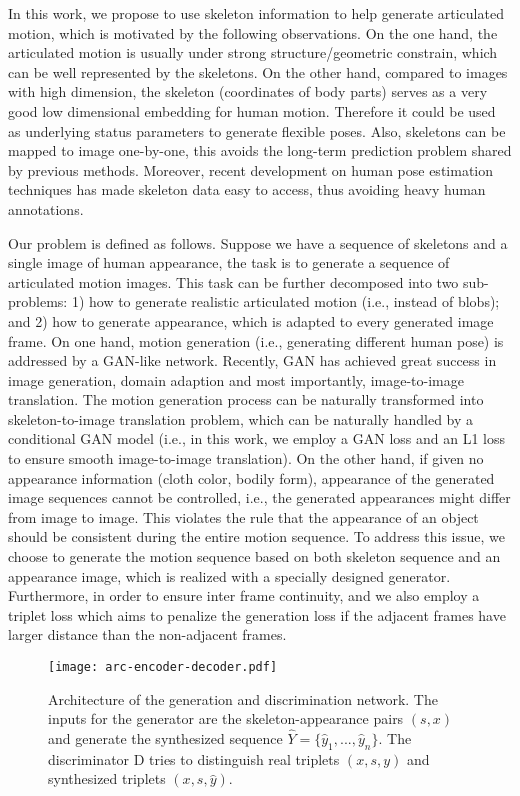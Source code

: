 \documentclass[journal]{IEEEtran}
\begin{document}
In this work, we propose to use skeleton information to help generate articulated motion, which is motivated by the following observations.
On the one hand, the articulated motion is usually under strong structure/geometric constrain, which can be well represented by the skeletons.
On the other hand, compared to images with high dimension, the skeleton (coordinates of body parts) serves as a very good low dimensional embedding for human motion. Therefore it could be used as underlying status parameters to generate flexible poses. Also, skeletons can be mapped to image one-by-one, this avoids the long-term prediction problem shared by previous methods.
Moreover, recent development on human pose estimation techniques has made skeleton data easy to access, thus avoiding heavy human annotations.

Our problem is defined as follows. Suppose we have a sequence of skeletons and a single image of human appearance, the task is to generate a sequence of articulated motion images. This task can be further decomposed into two sub-problems: 1) how to generate realistic articulated motion (i.e., instead of blobs); and 2) how to generate appearance, which is adapted to every generated image frame.
On one hand, motion generation (i.e., generating different human pose) is addressed by a GAN-like network. Recently, GAN has achieved great success in image generation, domain adaption and most importantly, image-to-image translation. The motion generation process can be naturally transformed into skeleton-to-image translation problem, which can be naturally handled by a conditional GAN model (i.e., in this work, we employ a GAN loss and an L1 loss to ensure smooth image-to-image translation). On the other hand, if given no appearance information (cloth color, bodily form), appearance of the generated image sequences cannot be controlled, i.e., the generated appearances might differ from image to image. This violates the rule that the appearance of an object should be consistent during the entire motion sequence. To address this issue, we choose to generate the motion sequence based on both skeleton sequence and an appearance image, which is realized with a specially designed generator. Furthermore, in order to ensure inter frame continuity, and we also employ a triplet loss which aims to penalize the generation loss if the adjacent frames have larger distance than the non-adjacent frames.
\begin{figure*}
\texttt{[image: arc-encoder-decoder.pdf]}
\caption{Architecture of the generation and discrimination network. The inputs for the generator are the skeleton-appearance pairs $(s,x)$ and generate the synthesized sequence $\hat{Y}=\{\hat{y}_1,...,\hat{y}_n\}$. The discriminator D tries to distinguish real triplets $(x,s,y)$ and synthesized triplets $(x,s,\hat{y})$.}
\label{fig:arc}
\end{figure*}
\end{document}
